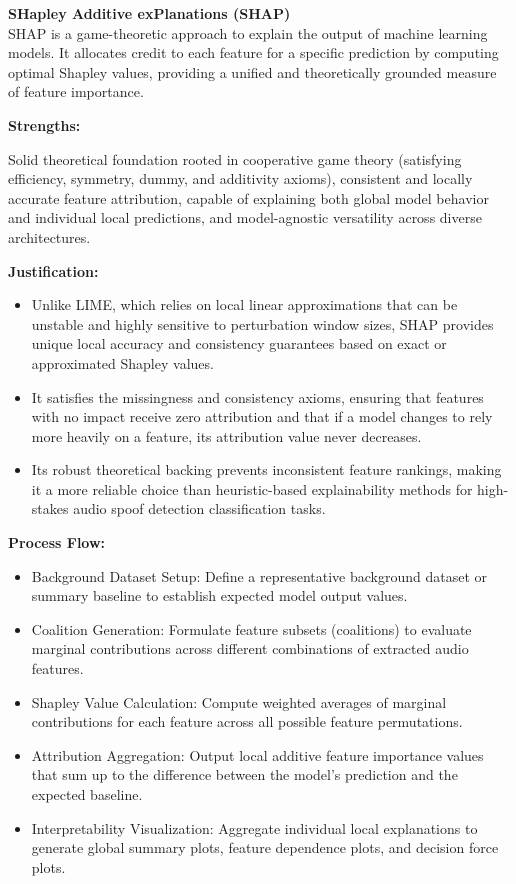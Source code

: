 \documentclass[12pt,a4paper]{report}
\begin{document}
\textbf{SHapley Additive exPlanations (SHAP)} \\
SHAP is a game-theoretic approach to explain the output of machine learning models. It allocates credit to each feature for a specific prediction by computing optimal Shapley values, providing a unified and theoretically grounded measure of feature importance.

\textbf{Strengths:}

Solid theoretical foundation rooted in cooperative game theory (satisfying efficiency, symmetry, dummy, and additivity axioms), consistent and locally accurate feature attribution, capable of explaining both global model behavior and individual local predictions, and model-agnostic versatility across diverse architectures.

\textbf{Justification:}

\begin{itemize}[itemsep=.2pt, topsep=1pt]
\item Unlike LIME, which relies on local linear approximations that can be unstable and highly sensitive to perturbation window sizes, SHAP provides unique local accuracy and consistency guarantees based on exact or approximated Shapley values.
\item It satisfies the missingness and consistency axioms, ensuring that features with no impact receive zero attribution and that if a model changes to rely more heavily on a feature, its attribution value never decreases.
\item Its robust theoretical backing prevents inconsistent feature rankings, making it a more reliable choice than heuristic-based explainability methods for high-stakes audio spoof detection classification tasks.
\end{itemize}

\textbf{Process Flow:}

\begin{itemize}[itemsep=.2pt, topsep=1pt]
\item Background Dataset Setup: Define a representative background dataset or summary baseline to establish expected model output values.
\item Coalition Generation: Formulate feature subsets (coalitions) to evaluate marginal contributions across different combinations of extracted audio features.
\item Shapley Value Calculation: Compute weighted averages of marginal contributions for each feature across all possible feature permutations.
\item Attribution Aggregation: Output local additive feature importance values that sum up to the difference between the model's prediction and the expected baseline.
\item Interpretability Visualization: Aggregate individual local explanations to generate global summary plots, feature dependence plots, and decision force plots.
\end{itemize}
\end{document}
